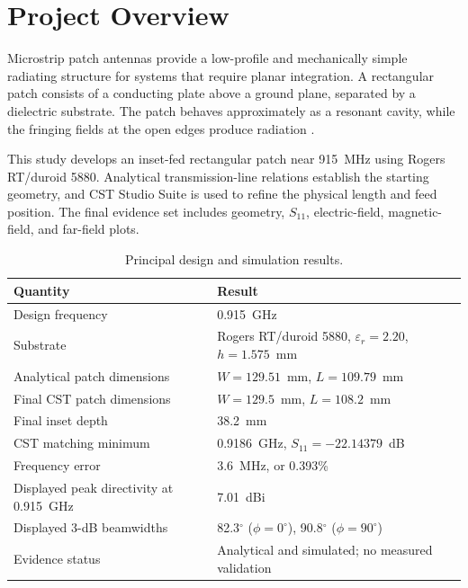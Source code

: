 \section{Project Overview}
\label{sec:project-overview}

Microstrip patch antennas provide a low-profile and mechanically simple radiating
structure for systems that require planar integration. A rectangular patch consists of
a conducting plate above a ground plane, separated by a dielectric substrate. The
patch behaves approximately as a resonant cavity, while the fringing fields at the open
edges produce radiation \cite{stutzman2013antenna}.

This study develops an inset-fed rectangular patch near 915~MHz using Rogers
RT/duroid 5880. Analytical transmission-line relations establish the starting geometry,
and CST Studio Suite is used to refine the physical length and feed position. The final
evidence set includes geometry, $S_{11}$, electric-field, magnetic-field, and far-field
plots.

\begin{table}[H]
\centering
\caption{Principal design and simulation results.}
\label{tab:principal-results}
\begin{tabularx}{\textwidth}{@{}>{\raggedright\arraybackslash}p{}X@{}}
\toprule
\textbf{Quantity} & \textbf{Result} \\
\midrule
Design frequency & 0.915~GHz \\
Substrate & Rogers RT/duroid 5880, $\varepsilon_r=2.20$, $h=1.575$~mm \\
Analytical patch dimensions & $W=129.51$~mm, $L=109.79$~mm \\
Final CST patch dimensions & $W=129.5$~mm, $L=108.2$~mm \\
Final inset depth & 38.2~mm \\
CST matching minimum & 0.9186~GHz, $S_{11}=-22.14379$~dB \\
Frequency error & 3.6~MHz, or 0.393\% \\
Displayed peak directivity at 0.915~GHz & 7.01~dBi \\
Displayed 3-dB beamwidths & 82.3$^\circ$ ($\phi=0^\circ$), 90.8$^\circ$ ($\phi=90^\circ$) \\
Evidence status & Analytical and simulated; no measured validation \\
\bottomrule
\end{tabularx}
\end{table}
